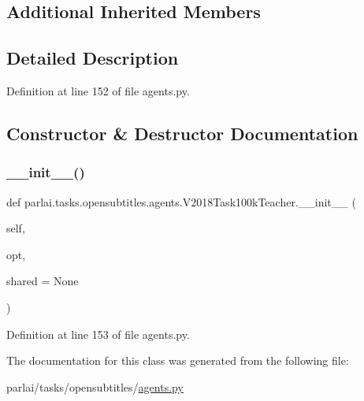 \subsection*{Additional Inherited Members}


\subsection{Detailed Description}


Definition at line 152 of file agents.\+py.



\subsection{Constructor \& Destructor Documentation}
\mbox{\label{classparlai_1_1tasks_1_1opensubtitles_1_1agents_1_1V2018Task100kTeacher_a7a99a122c49fcc88a4a9f5261a4fefcb}} 
\subsubsection{\texorpdfstring{\+\_\+\+\_\+init\+\_\+\+\_\+()}{\_\_init\_\_()}}
{\footnotesize\ttfamily def parlai.\+tasks.\+opensubtitles.\+agents.\+V2018\+Task100k\+Teacher.\+\_\+\+\_\+init\+\_\+\+\_\+ (\begin{DoxyParamCaption}\item[{}]{self,  }\item[{}]{opt,  }\item[{}]{shared = {\ttfamily None} }\end{DoxyParamCaption})}



Definition at line 153 of file agents.\+py.



The documentation for this class was generated from the following file\+:\begin{DoxyCompactItemize}
\item 
parlai/tasks/opensubtitles/\hyperlink{parlai_2tasks_2opensubtitles_2agents_8py}{agents.\+py}\end{DoxyCompactItemize}
